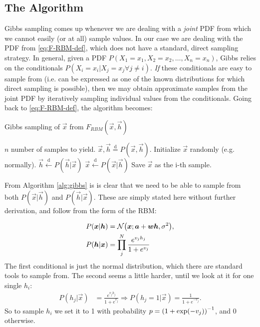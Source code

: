 \documentclass[a4paper, 11pt]{article}
\newcommand{\drawfrom}{\overset{\mathrm{d}}{=}}
\newcommand{\setfrom}{\overset{\mathrm{d}}{\leftarrow}}
\begin{document}
\begin{multicols}{2}
    \subsection{The Algorithm} 

    Gibbs sampling comes up whenever we are dealing
    with a \emph{joint} PDF from which we cannot easily (or at all) sample
    values.  In our case we are dealing with the PDF from
    \autoref{eq:F-RBM-def}, which does not have a standard, direct sampling
    strategy.  In general, given a PDF $P(X_1=x_1, X_2=x_2,\dots,X_n=x_n)$,
    Gibbs relies on the conditionals $P(X_i=x_i | X_j = x_j \forall j\neq i)$.
    \emph{If} these conditionals are easy to sample from (i.e. can be expressed
    as one of the known distributions for which direct sampling is possible),
    then we may obtain approximate samples from the joint PDF by iteratively
    sampling individual values from the conditionals. Going back to
    \autoref{eq:F-RBM-def}, the algorithm becomes:

\begin{algorithm}[H]
    \caption{Gibbs sampling of $\vec x$ from $F_{RBM}(\vec x, \vec h)$}
    \label{alg:gibbs}
    \begin{algorithmic}
        \REQUIRE $n$ number of samples to yield.
        \ENSURE $\vec x,\vec h \drawfrom P(\vec x, \vec h)$.
        \STATE Initialize $\vec x$ randomly (e.g. normally).
        \STATE $\vec h \setfrom P(\vec h | \vec x)$
        \STATE $\vec x \setfrom P(\vec x | \vec h)$
        \STATE Save $\vec x$ as the i-th sample.
        \ENDFOR
    \end{algorithmic}
\end{algorithm}

    From Algorithm \ref{alg:gibbs} is is clear that we need to be able to sample from
    both $P(\vec x|\vec h)$ and $P(\vec h|\vec x)$. These are simply stated here
    without further derivation, and follow from the form of the RBM:

    \begin{align}
        P(\bm x|\bm h) &= \mathcal{N}\qty(\bm x; \bm a + \bm w\bm h,
        \sigma^2)\label{eq:P-x-cond-h},\\
        P(\bm h|\bm x) &= \prod_{j}^N \frac{e^{v_j h_j}}{1+e^{v_j}}
    \end{align}
    The first conditional is just the normal distribution, which there are
    standard tools to sample from. The second seems a little harder, until we
    look at it for one single $h_i$:
    \begin{align}
        P(h_j|\vec x) &= \frac{e^{v_j h_j}}{1+e^{v_j}}
        \Rightarrow P(h_j=1|\vec x) = \frac{1}{1+e^{-v_j}}.
    \end{align}
    So to sample $h_i$ we set it to 1 with probability
    $p=\qty(1+\exp(-v_j))^{-1}$, and 0 otherwise.


\end{multicols}
\end{document}
